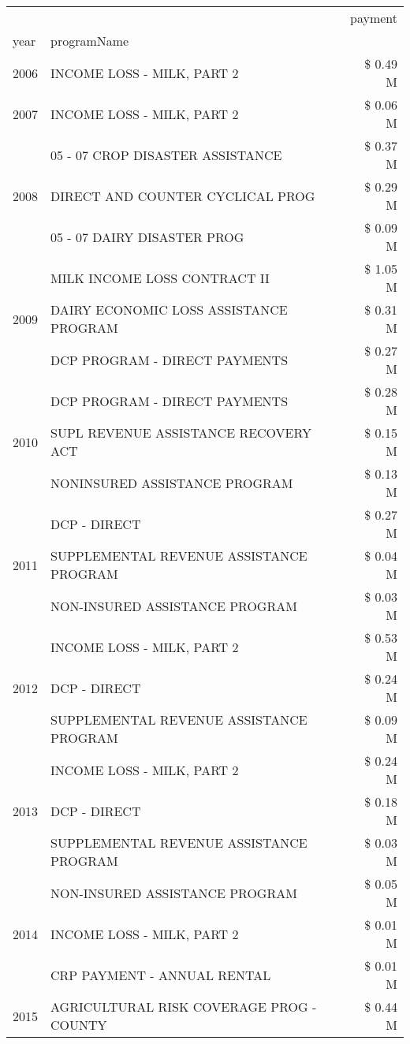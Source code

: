 \begin{tabular}{llr}
\toprule
 &  & payment \\
year & programName &  \\
\midrule
2006 & INCOME LOSS - MILK, PART 2 & \$ 0.49 M \\
\cline{1-3}
2007 & INCOME LOSS - MILK, PART 2 & \$ 0.06 M \\
\cline{1-3}
\multirow[t]{3}{*}{2008} & 05 - 07 CROP DISASTER ASSISTANCE & \$ 0.37 M \\
 & DIRECT AND COUNTER CYCLICAL PROG & \$ 0.29 M \\
 & 05 - 07 DAIRY DISASTER PROG & \$ 0.09 M \\
\cline{1-3}
\multirow[t]{3}{*}{2009} & MILK INCOME LOSS CONTRACT II & \$ 1.05 M \\
 & DAIRY ECONOMIC LOSS ASSISTANCE PROGRAM & \$ 0.31 M \\
 & DCP PROGRAM - DIRECT PAYMENTS & \$ 0.27 M \\
\cline{1-3}
\multirow[t]{3}{*}{2010} & DCP PROGRAM - DIRECT PAYMENTS & \$ 0.28 M \\
 & SUPL REVENUE ASSISTANCE RECOVERY ACT & \$ 0.15 M \\
 & NONINSURED ASSISTANCE PROGRAM & \$ 0.13 M \\
\cline{1-3}
\multirow[t]{3}{*}{2011} & DCP - DIRECT & \$ 0.27 M \\
 & SUPPLEMENTAL REVENUE ASSISTANCE PROGRAM & \$ 0.04 M \\
 & NON-INSURED ASSISTANCE PROGRAM & \$ 0.03 M \\
\cline{1-3}
\multirow[t]{3}{*}{2012} & INCOME LOSS - MILK, PART 2 & \$ 0.53 M \\
 & DCP - DIRECT & \$ 0.24 M \\
 & SUPPLEMENTAL REVENUE ASSISTANCE PROGRAM & \$ 0.09 M \\
\cline{1-3}
\multirow[t]{3}{*}{2013} & INCOME LOSS - MILK, PART 2 & \$ 0.24 M \\
 & DCP - DIRECT & \$ 0.18 M \\
 & SUPPLEMENTAL REVENUE ASSISTANCE PROGRAM & \$ 0.03 M \\
\cline{1-3}
\multirow[t]{3}{*}{2014} & NON-INSURED ASSISTANCE PROGRAM & \$ 0.05 M \\
 & INCOME LOSS - MILK, PART 2 & \$ 0.01 M \\
 & CRP PAYMENT - ANNUAL RENTAL & \$ 0.01 M \\
\cline{1-3}
\multirow[t]{3}{*}{2015} & AGRICULTURAL RISK COVERAGE PROG - COUNTY & \$ 0.44 M \\

\end{tabular}
